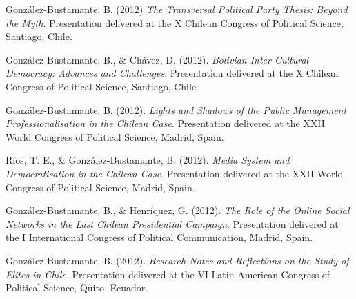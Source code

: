 \begin{publications}
\begin{benumerate}{77}
\item{\small González-Bustamante, B. (2012) {\itshape The Transversal Political Party Thesis: Beyond the Myth}. Presentation delivered at the X Chilean Congress of Political Science, Santiago, Chile.}\vspace{1mm}

\item{\small González-Bustamante, B., \& Chávez, D. (2012). {\itshape Bolivian Inter-Cultural Democracy: Advances and Challenges}. Presentation delivered at the X Chilean Congress of Political Science, Santiago, Chile.}\vspace{1mm}

\item{\small González-Bustamante, B. (2012). {\itshape Lights and Shadows of the Public Management Professionalisation in the Chilean Case}. Presentation delivered at the XXII World Congress of Political Science, Madrid, Spain.}\vspace{1mm}

\item{\small Ríos, T. E., \& González-Bustamante, B. (2012). {\itshape Media System and Democratisation in the Chilean Case}. Presentation delivered at the XXII World Congress of Political Science, Madrid, Spain.}\vspace{1mm}

\item{\small González-Bustamante, B., \& Henríquez, G. (2012). {\itshape The Role of the Online Social Networks in the Last Chilean Presidential Campaign}. Presentation delivered at the I International Congress of Political Communication, Madrid, Spain.}\vspace{1mm}

\item{\small González-Bustamante, B. (2012). {\itshape Research Notes and Reflections on the Study of Elites in Chile}. Presentation delivered at the VI Latin American Congress of Political Science, Quito, Ecuador.}

\end{benumerate}

\end{publications}
